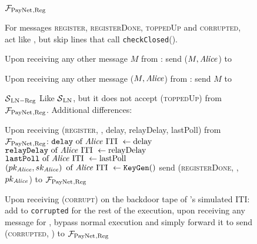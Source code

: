 \begin{figure}[!htbp]
  \begin{systembox}{$\mathcal{F}_{\mathrm{PayNet}}{}_{\mathrm{, Reg}}$}
    \begin{algorithmic}[1]
      \State For messages \textsc{register}, \textsc{registerDone},
      \textsc{toppedUp} and \textsc{corrupted}, act like \fpaynet{}, but skip
      lines that call \texttt{checkClosed}().
      \Statex

      \State Upon receiving any other message $M$ from \alice:
      \Indent
          \State send ($M, \mathit{Alice}$) to \simulator
        \EndIf
      \EndIndent
      \Statex

      \State Upon receiving any other message ($M, \mathit{Alice}$) from \simulator:
      \Indent
          \State send $M$ to \alice
        \EndIf
      \EndIndent
    \end{algorithmic}
  \end{systembox}
  \caption{}
  \label{alg:proof:fpaynet:reg}
\end{figure}

\begin{figure}[!htbp]
  \begin{simulatorbox}{$\mathcal{S}{}_{\mathrm{LN - Reg}}$}
    Like $\mathcal{S}{}_{\mathrm{LN}}$, but it does not accept
    (\textsc{toppedUp}) from $\mathcal{F}_{\mathrm{PayNet}}{}_{\mathrm{, Reg}}$.
    Additional differences:
    \begin{algorithmic}[1]
      \State Upon receiving (\textsc{register}, \alice, delay, relayDelay,
      lastPoll) from $\mathcal{F}_{\mathrm{PayNet}}{}_{\mathrm{, Reg}}$:
      \Indent
        \State $\mathtt{delay} \text{ of \ensuremath{\mathit{Alice}}{} ITI } \gets \mathrm{delay}$
        \label{alg:sim:reg:delay}
        \State $\mathtt{relayDelay} \text{ of \ensuremath{\mathit{Alice}}{} ITI } \gets
        \mathrm{relayDelay}$
        \State $\mathtt{lastPoll} \text{ of \ensuremath{\mathit{Alice}}{} ITI } \gets
        \mathrm{lastPoll}$
        \State $\left(pk_{\mathit{Alice}}, sk_{\mathit{Alice}}\right) \text{ of \ensuremath{\mathit{Alice}}{} ITI }
        \gets \mathtt{KeyGen}()$
        \label{alg:sim:reg:keygen}
        \State send (\textsc{registerDone}, \alice, $pk_{\mathit{Alice}}$) to
        $\mathcal{F}_{\mathrm{PayNet}}{}_{\mathrm{, Reg}}$
      \EndIndent
      \Statex

      \State Upon receiving (\textsc{corrupt}) on the backdoor tape of \alice's
      simulated ITI:
      \Indent
        \State add \alice{} to \texttt{corrupted}
        \State for the rest of the execution, upon receiving any message for
        \alice{}, bypass normal execution and simply forward it to
        \alice
        \State send (\textsc{corrupted}, \alice) to $\mathcal{F}_{\mathrm{PayNet}}{}_{\mathrm{,
        Reg}}$
      \EndIndent
    \end{algorithmic}
  \end{simulatorbox}
  \caption{}
  \label{alg:sim:reg}
\end{figure}

